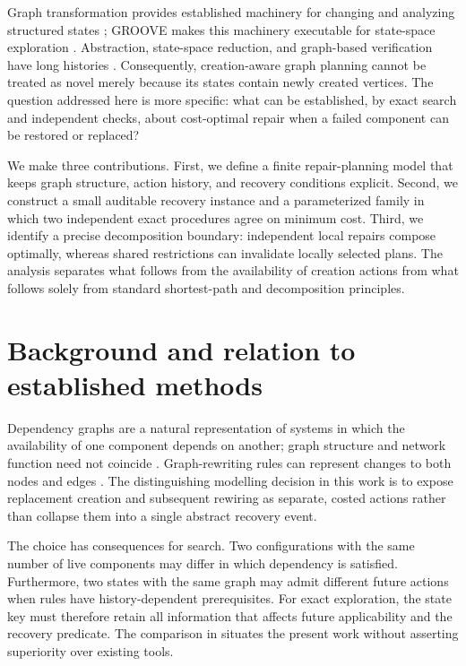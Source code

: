 \documentclass[11pt,a4paper]{article}
\begin{document}
Graph transformation provides established machinery for changing and analyzing structured states \cite{Ehrig2006,Konig2018}; GROOVE makes this machinery executable for state-space exploration \cite{Rensink2004,Ghamarian2012}. Abstraction, state-space reduction, and graph-based verification have long histories \cite{Burch1992,Emerson2005,Rensink2004Comparison,Konig2025}. Consequently, creation-aware graph planning cannot be treated as novel merely because its states contain newly created vertices. The question addressed here is more specific: what can be established, by exact search and independent checks, about cost-optimal repair when a failed component can be restored or replaced?

We make three contributions. First, we define a finite repair-planning model that keeps graph structure, action history, and recovery conditions explicit. Second, we construct a small auditable recovery instance and a parameterized family in which two independent exact procedures agree on minimum cost. Third, we identify a precise decomposition boundary: independent local repairs compose optimally, whereas shared restrictions can invalidate locally selected plans. The analysis separates what follows from the availability of creation actions from what follows solely from standard shortest-path and decomposition principles.

\section{Background and relation to established methods}
Dependency graphs are a natural representation of systems in which the availability of one component depends on another; graph structure and network function need not coincide \cite{Newman2003}. Graph-rewriting rules can represent changes to both nodes and edges \cite{Ehrig2006,Konig2018,Plump1999}. The distinguishing modelling decision in this work is to expose replacement creation and subsequent rewiring as separate, costed actions rather than collapse them into a single abstract recovery event.

The choice has consequences for search. Two configurations with the same number of live components may differ in which dependency is satisfied. Furthermore, two states with the same graph may admit different future actions when rules have history-dependent prerequisites. For exact exploration, the state key must therefore retain all information that affects future applicability and the recovery predicate. The comparison in  situates the present work without asserting superiority over existing tools.
\end{document}
